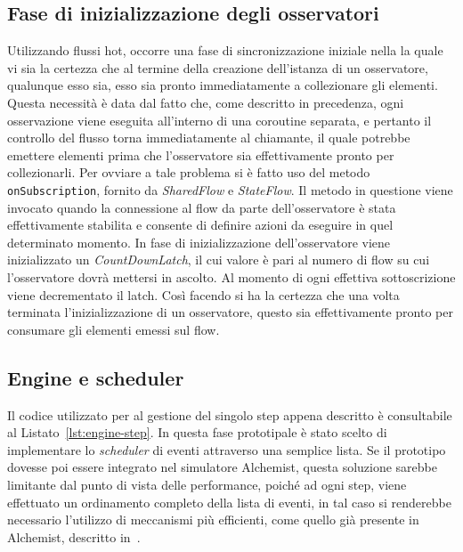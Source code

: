 \documentclass[12pt,a4paper,openright,twoside]{book}
\begin{document}
\subsection{Fase di inizializzazione degli osservatori}
Utilizzando flussi hot, occorre una fase di sincronizzazione iniziale nella la quale vi sia la certezza che al termine della creazione dell'istanza di un osservatore, qualunque esso sia, esso sia pronto immediatamente a collezionare gli elementi.
Questa necessità è data dal fatto che, come descritto in precedenza, ogni osservazione viene eseguita all'interno di una coroutine separata, e pertanto il controllo del flusso torna immediatamente al chiamante, il quale potrebbe emettere elementi prima che l'osservatore sia effettivamente pronto per collezionarli. 
Per ovviare a tale problema si è fatto uso del metodo \texttt{onSubscription}, fornito da \textit{SharedFlow} e \textit{StateFlow}. Il metodo in questione viene invocato quando la connessione al flow da parte dell'osservatore è stata effettivamente stabilita e consente di definire azioni da eseguire in quel determinato momento.
In fase di inizializzazione dell'osservatore viene inizializzato un \textit{CountDownLatch}, il cui valore è pari al numero di flow su cui l'osservatore dovrà mettersi in ascolto. 
Al momento di ogni effettiva sottoscrizione viene decrementato il latch. 
Così facendo si ha la certezza che una volta terminata l'inizializzazione di un osservatore, questo sia effettivamente pronto per consumare gli elementi emessi sul flow. 

\subsection{Engine e scheduler}
Il codice utilizzato per al gestione del singolo step appena descritto è consultabile al Listato~\ref{lst:engine-step}. 
In questa fase prototipale è stato scelto di implementare lo \textit{scheduler} di eventi attraverso una semplice lista. Se il prototipo dovesse poi essere integrato nel simulatore Alchemist, questa soluzione sarebbe limitante dal punto di vista delle performance, poiché ad ogni step, viene effettuato un ordinamento completo della lista di eventi, in tal caso si renderebbe necessario l'utilizzo di meccanismi più efficienti, come quello già presente in Alchemist, descritto in~. 


\end{document}
